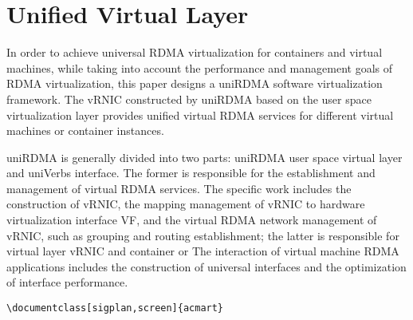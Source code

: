 \documentclass[sigplan,screen]{acmart}
\begin{document}
\section{Unified Virtual Layer}
In order to achieve universal RDMA virtualization for containers and virtual machines, while taking into account the performance and management goals of RDMA virtualization, this paper designs a uniRDMA software virtualization framework. The vRNIC constructed by uniRDMA based on the user space virtualization layer provides unified virtual RDMA services for different virtual machines or container instances.

uniRDMA is generally divided into two parts: uniRDMA user space virtual layer and uniVerbs interface. The former is responsible for the establishment and management of virtual RDMA services. The specific work includes the construction of vRNIC, the mapping management of vRNIC to hardware virtualization interface VF, and the virtual RDMA network management of vRNIC, such as grouping and routing establishment; the latter is responsible for virtual layer vRNIC and container or The interaction of virtual machine RDMA applications includes the construction of universal interfaces and the optimization of interface performance.


\begin{verbatim}
\documentclass[sigplan,screen]{acmart}
\end{verbatim}
\end{document}
